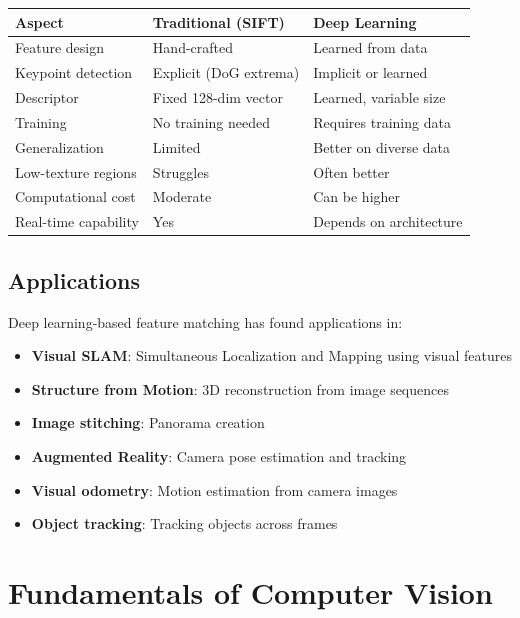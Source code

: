 \documentclass[11pt,a4paper]{article}
\theoremstyle{definition}
\theoremstyle{plain}
\theoremstyle{remark}
\begin{document}
\begin{tcolorbox}[colback=purple!5!white,colframe=purple!75!black,title=\textbf{Deep Learning vs. Traditional Methods}]
\begin{center}
\begin{tabular}{|l|l|l|}
\hline
\textbf{Aspect} & \textbf{Traditional (SIFT)} & \textbf{Deep Learning} \\
\hline
Feature design & Hand-crafted & Learned from data \\
\hline
Keypoint detection & Explicit (DoG extrema) & Implicit or learned \\
\hline
Descriptor & Fixed 128-dim vector & Learned, variable size \\
\hline
Training & No training needed & Requires training data \\
\hline
Generalization & Limited & Better on diverse data \\
\hline
Low-texture regions & Struggles & Often better \\
\hline
Computational cost & Moderate & Can be higher \\
\hline
Real-time capability & Yes & Depends on architecture \\
\hline
\end{tabular}
\end{center}
\end{tcolorbox}

\subsection{Applications}

Deep learning-based feature matching has found applications in:
\begin{itemize}
    \item \textbf{Visual SLAM}: Simultaneous Localization and Mapping using visual features
    \item \textbf{Structure from Motion}: 3D reconstruction from image sequences
    \item \textbf{Image stitching}: Panorama creation
    \item \textbf{Augmented Reality}: Camera pose estimation and tracking
    \item \textbf{Visual odometry}: Motion estimation from camera images
    \item \textbf{Object tracking}: Tracking objects across frames
\end{itemize}

\section{Fundamentals of Computer Vision}
\end{document}
